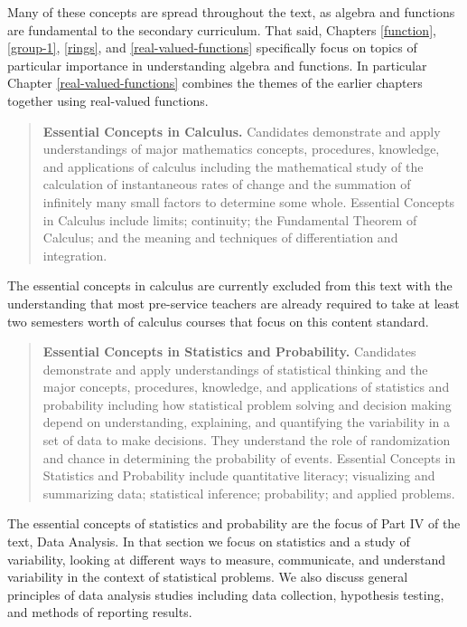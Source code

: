 \documentclass[
]{book}
\theoremstyle{definition}
\theoremstyle{definition}
\theoremstyle{definition}
\theoremstyle{definition}
\theoremstyle{remark}
\begin{document}
Many of these concepts are spread throughout the text, as algebra and functions are fundamental to the secondary curriculum. That said, Chapters \ref{function}, \ref{group-1}, \ref{rings}, and \ref{real-valued-functions} specifically focus on topics of particular importance in understanding algebra and functions. In particular Chapter \ref{real-valued-functions} combines the themes of the earlier chapters together using real-valued functions.

\begin{quote}
\textbf{Essential Concepts in Calculus.} Candidates demonstrate and apply understandings of major mathematics concepts, procedures, knowledge, and applications of calculus including the mathematical study of the calculation of instantaneous rates of change and the summation of infinitely many small factors to determine some whole. Essential Concepts in Calculus include limits; continuity; the Fundamental Theorem of Calculus; and the meaning and techniques of differentiation and integration.
\end{quote}

The essential concepts in calculus are currently excluded from this text with the understanding that most pre-service teachers are already required to take at least two semesters worth of calculus courses that focus on this content standard.

\begin{quote}
\textbf{Essential Concepts in Statistics and Probability.} Candidates demonstrate and apply understandings of statistical thinking and the major concepts, procedures, knowledge, and applications of statistics and probability including how statistical problem solving and decision making depend on understanding, explaining, and quantifying the variability in a set of data to make decisions. They understand the role of randomization and chance in determining the probability of events. Essential Concepts in Statistics and Probability include quantitative literacy; visualizing and summarizing data; statistical inference; probability; and applied problems.
\end{quote}

The essential concepts of statistics and probability are the focus of Part IV of the text, Data Analysis. In that section we focus on statistics and a study of variability, looking at different ways to measure, communicate, and understand variability in the context of statistical problems. We also discuss general principles of data analysis studies including data collection, hypothesis testing, and methods of reporting results.
\end{document}
